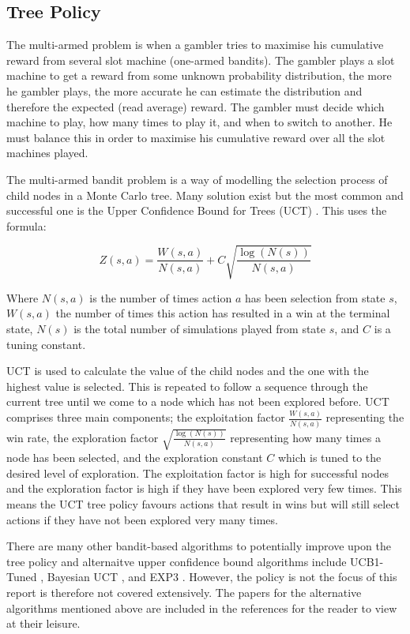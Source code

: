 \documentclass{bhamthesis}
\theoremstyle{definition}
\begin{document}
\subsection{Tree Policy}\label{s:tPolicy}
The multi-armed problem is when a gambler tries to maximise his cumulative reward from several slot machine (one-armed bandits). The gambler plays a slot machine to get a reward from some unknown probability distribution, the more he gambler plays, the more accurate he can estimate the distribution and therefore the expected (read average) reward. The gambler must decide which machine to play, how many times to play it, and when to switch to another. He must balance this in order to maximise his cumulative reward over all the slot machines played. 

The multi-armed bandit problem is a way of modelling the selection process of child nodes in a Monte Carlo tree. Many solution exist but the most common and successful one is the Upper Confidence Bound for Trees (UCT) \cite{Browne2012}. This uses the formula:

\begin{equation}\label{e:UCT}
Z(s,a) = \frac{W(s,a)}{N(s,a)} + C\sqrt{\frac{\log(N(s))}{N(s,a)}}
\end{equation} 


Where $N(s,a)$ is the number of times action $a$ has been selection from state $s$, $W(s,a)$ the number of times this action has resulted in a win at the terminal state, $N(s)$ is the total number of simulations played from state $s$, and $C$ is a tuning constant.

UCT is used to calculate the value of the child nodes and the one with the highest value is selected. This is repeated to follow a sequence through the current tree until we come to a node which has not been explored before. UCT comprises three main components; the exploitation factor $\frac{W(s,a)}{N(s,a)}$ representing the win rate, the exploration factor $\sqrt{\frac{\log(N(s))}{N(s,a)}}$ representing how many times a node has been selected, and the exploration constant $C$ which is tuned to the desired level of exploration. The exploitation factor is high for successful nodes and the exploration factor is high if they have been explored very few times. This means the UCT tree policy favours actions that result in wins but will still select actions if they have not been explored very many times.

There are many other bandit-based algorithms to potentially improve upon the tree policy and alternaitve upper confidence bound algorithms include UCB1-Tuned \cite{Auer2002}, Bayesian UCT \cite{Grunwald2010}, and EXP3 \cite{Auer1995} \cite{Audibert2009}. However, the policy is not the focus of this report is therefore not covered extensively. The papers for the alternative algorithms mentioned above are included in the references for the reader to view at their leisure.
\end{document}
